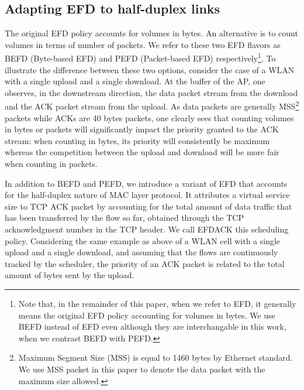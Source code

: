 \documentclass[preprint,12pt]{elsarticle}
\begin{document}
 
\subsection{Adapting EFD to half-duplex links} \label{subsec:halfdup}
The original EFD policy accounts for volumes in bytes. An alternative is to count volumes in terms of number of packets. We refer to these two EFD flavors as BEFD (Byte-based EFD) and PEFD (Packet-based EFD) respectively\footnote{Note that, in the remainder of this paper, when we refer to EFD, it generally means the original EFD policy accounting for volumes in bytes. We use BEFD instead of EFD even although they are interchangable in this work, when we contrast BEFD with PEFD.}. To illustrate the difference between these two options, consider the case of a WLAN with a single upload and a single download. At the buffer of the AP, one observes, in the downstream direction, the data packet stream from the download and the ACK packet stream from the upload. As data packets are generally MSS\footnote{Maximum Segment Size (MSS) is equal to 1460 bytes by Ethernet standard. We use MSS packet in this paper to denote the data packet with the maximum size allowed.} packets while ACKs are 40 bytes packets, one clearly sees that counting volumes in bytes or packets will significantly impact the priority granted to the ACK stream: when counting in bytes, its priority will consistently be maximum whereas the competition between the upload and download will be more fair when counting in packets.

In addition to BEFD and PEFD, we introduce a variant of EFD that accounts for the half-duplex nature of MAC layer protocol. It attributes a virtual service size to TCP ACK packet by accounting for the total amount of data traffic that has been transferred by the flow so far, obtained through the TCP acknowledgment number in the TCP header. We call EFDACK this scheduling policy. Considering the same example as above of a WLAN cell with a single upload and a single download, and assuming that the flows are continuously tracked by the scheduler, the priority of an ACK packet is related to the total amount of bytes sent by the upload.  %


\end{document}
